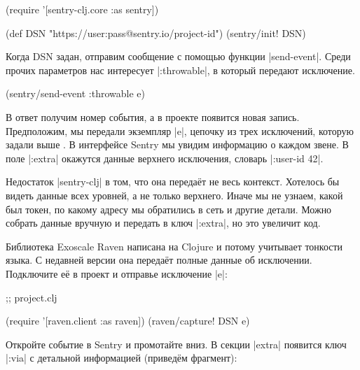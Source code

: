 \begin{english}
  \begin{clojure}
(require '[sentry-clj.core :as sentry])

(def DSN "https://user:pass@sentry.io/project-id")
(sentry/init! DSN)
  \end{clojure}
\end{english}

Когда DSN задан, отправим сообщение с помощью функции \spverb|send-event|. Среди
прочих параметров нас интересует \spverb|:throwable|, в который передают
исключение.

\begin{english}
  \begin{clojure}
(sentry/send-event {:throwable e})
  \end{clojure}
\end{english}

В ответ получим номер события, а в проекте появится новая запись. Предположим,
мы передали экземпляр \spverb|e|, цепочку из трех исключений, которую задали
выше . В интерфейсе Sentry мы увидим информацию о каждом звене. В
поле \spverb|:extra| окажутся данные верхнего исключения, словарь
\spverb|{:user-id 42}|.

Недостаток \spverb|sentry-clj| в том, что она переда\"{е}т не весь
контекст. Хотелось бы видеть данные всех уровней, а не только верхнего. Иначе мы
не узнаем, какой был токен, по какому адресу мы обратились в сеть и другие
детали. Можно собрать данные вручную и передать в ключ \spverb|:extra|, но это
увеличит код.


Библиотека Exoscale Raven написана на Clojure и потому учитывает тонкости
языка. С недавней версии она переда\"{е}т полные данные об
исключении. Подключите е\"{е} в проект и отправье исключение \spverb|e|:

\begin{english}
  \begin{clojure}
 ;; project.clj

(require '[raven.client :as raven])
(raven/capture! DSN e)
  \end{clojure}
\end{english}

Откройте событие в Sentry и промотайте вниз. В секции \spverb|extra| появится
ключ \spverb|:via| с детальной информацией (привед\"{е}м фрагмент):

\begin{english}
  \begin{json}
  \end{json}
\end{english}

